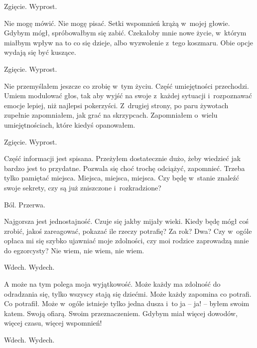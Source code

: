 \begin{itquote}
Zgięcie. Wyprost.
\end{itquote}

Nie mogę mówić. Nie mogę pisać. Setki wspomnień krążą w~mojej głowie. Gdybym mógł, spróbowałbym się zabić. Czekałoby 
mnie nowe życie, w~którym miałbym wpływ na to co się dzieje, albo wyzwolenie z~tego koszmaru. Obie opcje wydają się 
być kuszące.

\begin{itquote}
Zgięcie. Wyprost.
\end{itquote}

Nie przemyślałem jeszcze co zrobię w~tym życiu. Część umiejętności przechodzi. Umiem modulować głos, tak aby wyjść na 
swoje z~każdej sytuacji i~rozpoznawać emocje lepiej, niż najlepsi pokerzyści. Z~drugiej strony, po paru żywotach 
zupełnie zapomniałem, jak grać na skrzypcach. Zapomniałem o~wielu umiejętnościach, które kiedyś opanowałem.

\begin{itquote}
Zgięcie. Wyprost.
\end{itquote}

Część informacji jest spisana. Przeżyłem dostatecznie dużo, żeby wiedzieć jak bardzo jest to przydatne. Pozwala się 
choć trochę odciążyć, zapomnieć. Trzeba tylko pamiętać miejsca. Miejsca, miejsca, miejsca. Czy będę w~stanie znaleźć 
swoje sekrety, czy są już zniszczone i~rozkradzione?

\begin{itquote}
Ból. Przerwa.
\end{itquote}

Najgorsza jest jednostajność. Czuje się jakby mijały wieki. Kiedy będę mógł coś zrobić, jakoś zareagować, pokazać ile 
rzeczy potrafię? Za rok? Dwa? Czy w~ogóle opłaca mi się szybko ujawniać moje zdolności, czy moi rodzice zaprowadzą 
mnie do egzorcysty? Nie wiem, nie wiem, nie wiem.

\begin{itquote}
Wdech. Wydech.
\end{itquote}

A może na tym polega moja wyjątkowość. Może każdy ma zdolność do odradzania się, tylko wszyscy stają się dziećmi. 
Może każdy zapomina co potrafi. Co potrafił. Może w~ogóle istnieje tylko jedna dusza i~to ja -- ja! -- byłem swoim 
katem. Swoją ofiarą. Swoim przeznaczeniem. Gdybym miał więcej dowodów, więcej czasu, więcej wspomnień! 

\begin{itquote}
Wdech. Wydech.
\end{itquote}

